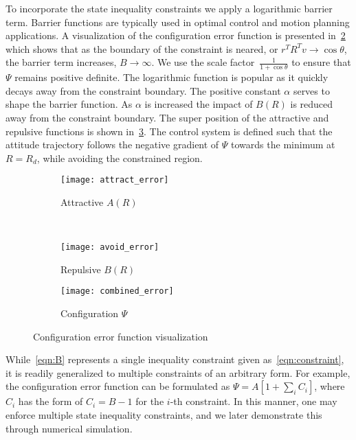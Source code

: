 \documentclass[letterpaper, 10 pt, conference]{ieeeconf}  %
\begin{document}
To incorporate the state inequality constraints we apply a logarithmic barrier term.
Barrier functions are typically used in optimal control and motion planning applications.
A visualization of the configuration error function is presented in~\cref{fig:avoid_error} which shows that as the boundary of the constraint is neared, or \( r^T R^T v \to \cos \theta \), the barrier term increases, \( B \to \infty\).
We use the scale factor~\(\frac{1}{1+\cos \theta} \) to ensure that \( \Psi \) remains positive definite.
The logarithmic function is popular as it quickly decays away from the constraint boundary.
The positive constant \( \alpha \) serves to shape the barrier function.
As \( \alpha \) is increased the impact of \( B(R) \) is reduced away from the constraint boundary. 
The super position of the attractive and repulsive functions is shown in~\cref{fig:combined_error}.
The control system is defined such that the attitude trajectory follows the negative gradient of \( \Psi \) towards the minimum at \( R = R_d \), while avoiding the constrained region.
\begin{figure} 
	\centering 
	\begin{subfigure}[htbp]{0.45\columnwidth} 
		\texttt{[image: attract\_error]} 
		\caption{Attractive \( A(R) \) } \label{fig:attract_error} 
	\end{subfigure}~ %
	\begin{subfigure}[htbp]{0.45\columnwidth} 
		\texttt{[image: avoid\_error]} 
		\caption{Repulsive \( B(R) \)} \label{fig:avoid_error} 
	\end{subfigure}
	\centering
	\begin{subfigure}[htbp]{0.45\columnwidth} 
		\texttt{[image: combined\_error]} 
		\caption{Configuration \( \Psi \)} \label{fig:combined_error} 
	\end{subfigure}
	\caption{Configuration error function visualization}
	\label{fig:config_error} 
\end{figure}

While~\cref{eqn:B} represents a single inequality constraint given as~\cref{eqn:constraint}, it is readily generalized to multiple constraints of an arbitrary form. 
For example, the configuration error function can be formulated as $\Psi=A[1+\sum_i C_i]$, where $C_i$ has the form of $C_i=B-1$ for the $i$-th constraint. 
In this manner, one may enforce multiple state inequality constraints, and we later demonstrate this through numerical simulation. 
\end{document}
